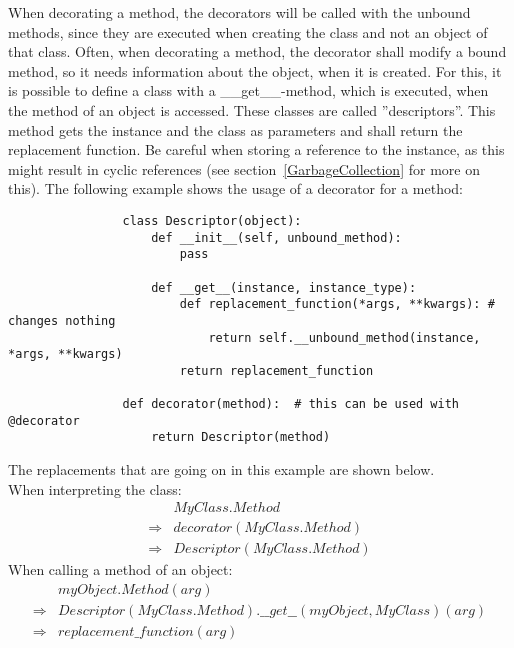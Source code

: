 			When decorating a method, the decorators will be called with the unbound methods, since they are executed when creating the class and not an object of that class.
			Often, when decorating a method, the decorator shall modify a bound method, so it needs information about the object, when it is created.
			For this, it is possible to define a class with a {\normalfont \ttfamily \_\_get\_\_}-method, which is executed, when the method of an object is accessed.
			These classes are called ''descriptors''.
			This method gets the instance and the class as parameters and shall return the replacement function.
			Be careful when storing a reference to the instance, as this might result in cyclic references (see section~\ref{GarbageCollection} for more on this).
			The following example shows the usage of a decorator for a method:
			\begin{verbatim}
				class Descriptor(object):
					def __init__(self, unbound_method):
						pass

					def __get__(instance, instance_type):
						def replacement_function(*args, **kwargs): # changes nothing
							return self.__unbound_method(instance, *args, **kwargs)
						return replacement_function

				def decorator(method):	# this can be used with @decorator
					return Descriptor(method)
			\end{verbatim}
			The replacements that are going on in this example are shown below.\\
			When interpreting the class:
			\begin{equation}
				\begin{aligned}
					            & MyClass.Method\\
					\Rightarrow & decorator(MyClass.Method)\\
					\Rightarrow & Descriptor(MyClass.Method)
				\end{aligned}
			\end{equation}
			When calling a method of an object:
			\begin{equation}
				\begin{aligned}
					            & myObject.Method(arg) \\
					\Rightarrow & Descriptor(MyClass.Method).\_\_get\_\_(myObject, MyClass)(arg) \\
					\Rightarrow & replacement\_function(arg)
				\end{aligned}
			\end{equation}


